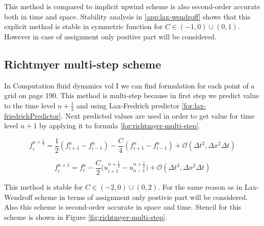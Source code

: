 			This method is compared to implicit upwind scheme is also second-order accurate both in time and space. Stability analysis in \ref{app:lax-wendroff} shows that this explicit method is stable in symmetric function for $C \in (-1, 0) \cup (0, 1)$. However in case of assignment only positive part will be considered.
			
		\subsection{Richtmyer multi-step scheme}
			In Computation fluid dynamics vol I\cite{bib:hoffman} we can find formulation for each point of a grid on page 190. This method is multi-step because in first step we predict value to the time level $n + \frac{1}{2}$ and using Lax-Fredrich predictor \ref{for:lax-friedrichPredictor}. Next predicted values are used in order to get value for time level $n+1$ by applying it to formula \ref{for:richtmyer-multi-step}.
			
			\begin{equation}
				\label{for:lax-friedrichPredictor}
				f_{i}^{n+\frac{1}{2}} = \frac{1}{2} (f_{i+1}^n - f_{i-1}^n) - \frac{C}{4}(f_{i+1}^n - f_{i-1}^n) + \mathcal{O}(\Delta t^2, \Delta x^2\Delta t)
			\end{equation}
			
			\begin{equation}
				\label{for:richtmyer-multi-step}
				f_i^{n+1} = f_i^n - \frac{C}{2}\Big(u_{i+1}^{n+\frac{1}{2}} - u_{n-1}^{n+\frac{1}{2}}\Big) + \mathcal{O} (\Delta t^3, \Delta x^2\Delta t)
			\end{equation}
			
			This method is stable for $C \in (-2, 0) \cup (0, 2)$. For the same reason as in Lax-Wendroff scheme in terms of assignment only postivie part will be considered. Also this scheme is second-order accurate in space and time. Stencil for this scheme is shown in Figure \ref{fig:richtmyer-multi-step}.
			
